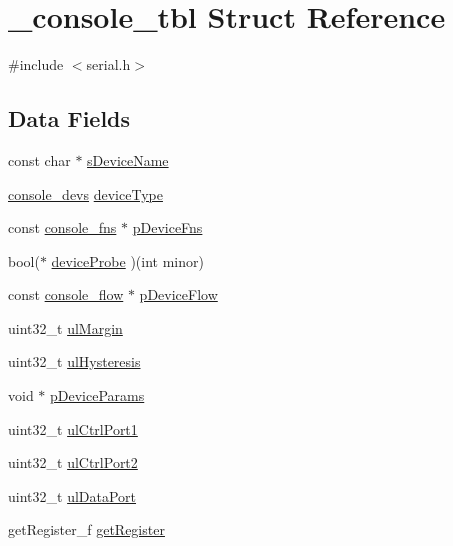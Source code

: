 \hypertarget{struct__console__tbl}{}\section{\+\_\+console\+\_\+tbl Struct Reference}
\label{struct__console__tbl}


{\ttfamily \#include $<$serial.\+h$>$}

\subsection*{Data Fields}
\begin{DoxyCompactItemize}
\item 
const char $\ast$ \mbox{\hyperlink{struct__console__tbl_afaaac8d73af8665cdb2128ed0daedac1}{s\+Device\+Name}}
\item 
\mbox{\hyperlink{serial_8h_a0450b2dba111c72a0316ed1912aeda71}{console\+\_\+devs}} \mbox{\hyperlink{struct__console__tbl_ab8c929a8444f2de9cec121db8dac7a1f}{device\+Type}}
\item 
const \mbox{\hyperlink{struct__console__fns}{console\+\_\+fns}} $\ast$ \mbox{\hyperlink{struct__console__tbl_ad4d1f97eb56c92acd6a466e35908fac2}{p\+Device\+Fns}}
\item 
bool($\ast$ \mbox{\hyperlink{struct__console__tbl_a6eb286b8e6770796a6220de81360b753}{device\+Probe}} )(int minor)
\item 
const \mbox{\hyperlink{struct__console__flow}{console\+\_\+flow}} $\ast$ \mbox{\hyperlink{struct__console__tbl_a303f5a7d96590db6ec8b20834867b30a}{p\+Device\+Flow}}
\item 
uint32\+\_\+t \mbox{\hyperlink{struct__console__tbl_a59327992956e06804d26eab199477706}{ul\+Margin}}
\item 
uint32\+\_\+t \mbox{\hyperlink{struct__console__tbl_a9918fca6cdf20e888e20d31088061d98}{ul\+Hysteresis}}
\item 
void $\ast$ \mbox{\hyperlink{struct__console__tbl_a153788e00d296408bb3e1f9f65864461}{p\+Device\+Params}}
\item 
uint32\+\_\+t \mbox{\hyperlink{struct__console__tbl_a19184d155c1e538fb219544a409c0372}{ul\+Ctrl\+Port1}}
\item 
uint32\+\_\+t \mbox{\hyperlink{struct__console__tbl_a5d2f221b15d9adaca8e425c5418822e4}{ul\+Ctrl\+Port2}}
\item 
uint32\+\_\+t \mbox{\hyperlink{struct__console__tbl_a29ab9bc78c3de156fa9684a0c3db4ffa}{ul\+Data\+Port}}
\item 
get\+Register\+\_\+f \mbox{\hyperlink{struct__console__tbl_ab5d0fa77acd682c7a0be5714fa0d81a9}{get\+Register}}

\end{DoxyCompactItemize}
